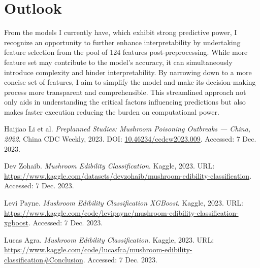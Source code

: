 \documentclass{article}
\begin{document}
\section{Outlook}
\hspace{0.5cm} From the models I currently have, which exhibit strong predictive power, I recognize an opportunity to further enhance interpretability by undertaking feature selection from the pool of 124 features post-preprocessing. While more feature set may contribute to the model's accuracy, it can simultaneously introduce complexity and hinder interpretability. By narrowing down to a more concise set of features, I aim to simplify the model and make its decision-making process more transparent and comprehensible. This streamlined approach not only aids in understanding the critical factors influencing predictions but also makes faster execution reducing the burden on computational power.


\begin{thebibliography}{9}

Haijiao Li et al.
\textit{Preplanned Studies: Mushroom Poisoning Outbreaks — China, 2022}.
China CDC Weekly, 2023.
DOI: \url{10.46234/ccdcw2023.009}.
Accessed: 7 Dec. 2023.

Dev Zohaib.
\textit{Mushroom Edibility Classification}.
Kaggle, 2023.
URL: \url{https://www.kaggle.com/datasets/devzohaib/mushroom-edibility-classification}.
Accessed: 7 Dec. 2023.

Levi Payne.
\textit{Mushroom Edibility Classification XGBoost}.
Kaggle, 2023.
URL: \url{https://www.kaggle.com/code/levipayne/mushroom-edibility-classification-xgboost}.
Accessed: 7 Dec. 2023.

Lucas Agra.
\textit{Mushroom Edibility Classification}.
Kaggle, 2023.
URL: \url{https://www.kaggle.com/code/lucasfca/mushroom-edibility-classification#Conclusion}.
Accessed: 7 Dec. 2023.

\end{thebibliography}
\end{document}
